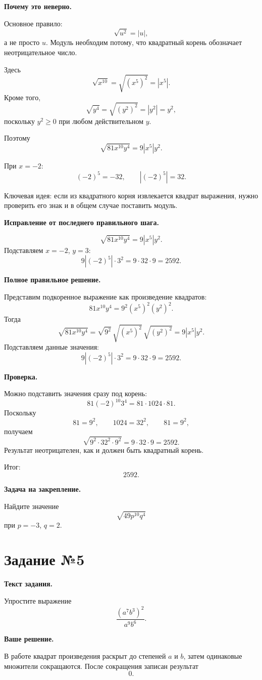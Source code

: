 \documentclass[12pt,a4paper]{article}
\begin{document}
\textbf{Почему это неверно.}

Основное правило:
\[
\sqrt{u^2}=|u|,
\]
а не просто $u$. Модуль необходим потому, что квадратный корень обозначает неотрицательное число.

Здесь
\[
\sqrt{x^{10}}=\sqrt{(x^5)^2}=|x^5|.
\]
Кроме того,
\[
\sqrt{y^4}=\sqrt{(y^2)^2}=|y^2|=y^2,
\]
поскольку $y^2\ge0$ при любом действительном $y$.

Поэтому
\[
\sqrt{81x^{10}y^4}=9|x^5|y^2.
\]

При $x=-2$:
\[
(-2)^5=-32,
\qquad
|(-2)^5|=32.
\]

\textcolor{blue!60!black}{Ключевая идея:} если из квадратного корня извлекается квадрат выражения, нужно проверить его знак и в общем случае поставить модуль.

\textbf{Исправление от последнего правильного шага.}

\[
\sqrt{81x^{10}y^4}
=
9|x^5|y^2.
\]
Подставляем $x=-2$, $y=3$:
\[
9|(-2)^5|\cdot3^2
=
9\cdot32\cdot9
=
2592.
\]

\textbf{Полное правильное решение.}

Представим подкоренное выражение как произведение квадратов:
\[
81x^{10}y^4
=
9^2(x^5)^2(y^2)^2.
\]
Тогда
\[
\sqrt{81x^{10}y^4}
=
\sqrt{9^2}\,\sqrt{(x^5)^2}\,\sqrt{(y^2)^2}
=
9|x^5|y^2.
\]
Подставляем данные значения:
\[
9|(-2)^5|\cdot3^2
=
9\cdot32\cdot9
=
2592.
\]

\textbf{Проверка.}

Можно подставить значения сразу под корень:
\[
81(-2)^{10}3^4
=
81\cdot1024\cdot81.
\]
Поскольку
\[
81=9^2,\qquad 1024=32^2,\qquad 81=9^2,
\]
получаем
\[
\sqrt{9^2\cdot32^2\cdot9^2}=9\cdot32\cdot9=2592.
\]
Результат неотрицателен, как и должен быть квадратный корень.

\textcolor{teal!60!black}{Итог:}
\[
\boxed{2592}.
\]

\textbf{Задача на закрепление.}

Найдите значение
\[
\sqrt{49p^{10}q^4}
\]
при $p=-3$, $q=2$.

\newpage
{}
\label{task:5}
\section*{Задание №5}

\textbf{Текст задания.}

Упростите выражение
\[
\frac{(a^7b^3)^2}{a^9b^6}.
\]

\textbf{Ваше решение.}

В работе квадрат произведения раскрыт до степеней $a$ и $b$, затем одинаковые множители сокращаются. После сокращения записан результат
\[
0.
\]
\end{document}
